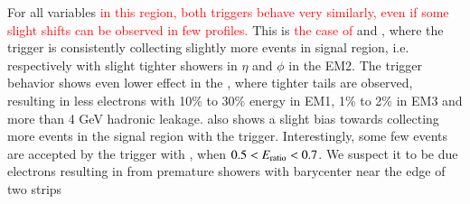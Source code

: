 For all variables 
\textcolor{red}{in this region, both triggers behave very similarly, even if some slight shifts can be observed in few profiles.}
This is \textcolor{red}{the case of} \reta{} and \rphi{}, where the \rnn{} trigger is consistently collecting slightly more events in signal region, i.e. respectively with slight tighter showers in $\eta{}$ and $\phi{}$ in the EM2. The \rnn{} trigger behavior shows even lower effect in the \rhad{}, where tighter tails are observed, resulting in less electrons with 10\% to 30\% energy in EM1, 1\% to 2\% in EM3 and more than 4 GeV hadronic leakage. \eratio{} also shows a slight bias towards collecting more events in the signal region with the \rnn{} trigger. Interestingly, some few events are accepted by the trigger with \rnn{}, when $0.5<E_\text{ratio}{}<0.7$. We suspect it to be due electrons resulting in from premature showers with barycenter near the edge of two strips




